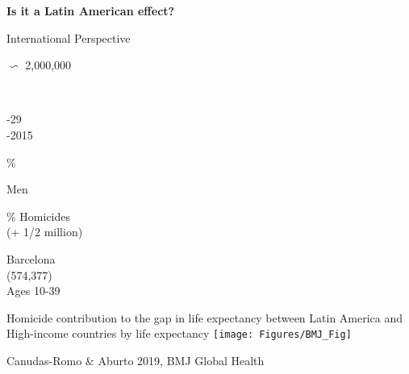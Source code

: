 \documentclass[xcolor={dvipsnames}]{beamer}
\begin{document}
\begin{frame}
	\Huge{
	\begin{center}
		\bf{Is it a Latin American effect?}
	\end{center}
	}
\end{frame}


\begin{frame}
\Huge{
\begin{center}
International Perspective \linebreak \\

{\fontsize{70}{80}\selectfont 

 $\backsim$ 2,000,000}\\ \pause
 
-29\\

\bigskip {}-2015

\end{center}
}
\end{frame}

\begin{frame}
\Huge{
\begin{center}
{\fontsize{70}{80}\% \\
}
\bigskip

{\fontsize{50}{60}\selectfont

Men
}

\end{center}
}
\end{frame}


\begin{frame}
\Huge{
\begin{center}
{\fontsize{70}{80}\% Homicides}\\
(+ 1/2 million)

\end{center}
}
\end{frame}


\begin{frame}
\Huge{
\begin{center}
{\fontsize{70}{80}\selectfont Barcelona}\\
(574,377) \\

Ages 10-39

\end{center}
}
\end{frame}


\begin{frame}
	\begin{center}
		\large{Homicide contribution to the gap in life expectancy between Latin America and High-income countries by life expectancy}
	\hspace*{-.8cm}    
	\texttt{[image: Figures/BMJ\_Fig]}	
	
		\end{center}

	\tiny{Canudas-Romo \& Aburto 2019, BMJ Global Health}
\end{frame}
\end{document}
